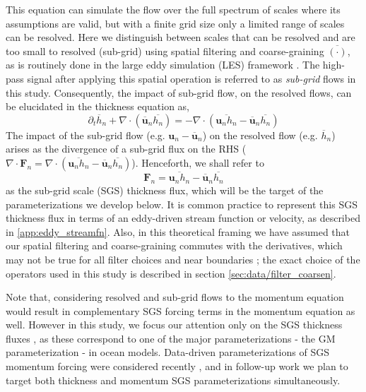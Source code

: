 \documentclass[draft]{agujournal2019}
\begin{document}
This equation can simulate the flow over the full spectrum of scales where its assumptions are valid, but with a finite grid size only a limited range of scales can be resolved. Here we distinguish between scales that can be resolved and are too small to resolved (sub-grid)
using spatial filtering and coarse-graining $\overline{(\cdot)}$, as is routinely done in the large eddy simulation (LES) framework \cite{sagaut2005large, aluie2018mapping}. The high-pass signal after applying this spatial operation is referred to as \textit{sub-grid} flows in this study.
Consequently, the impact of sub-grid flow, on the resolved flows, can be elucidated in the thickness equation as,
\begin{equation}
    \partial_t \overline{h}_n +  \nabla \cdot (\overline{\mathbf{u}}_n \overline{h_n}) = - \nabla \cdot (\overline{\mathbf{u}_n h_n} - \overline{\mathbf{u}}_n \overline{h_n}) %
\end{equation}
The impact of the sub-grid flow (e.g. ${\mathbf{u}}_n -\overline{\mathbf{u}}_n$) on the resolved flow (e.g. $\overline{h}_n$) arises as the divergence of a sub-grid flux on the RHS ($\nabla \cdot \mathbf{F}_n = \nabla \cdot (\overline{\mathbf{u}_n h_n} - \overline{\mathbf{u}}_n \overline{h_n})$). Henceforth, we shall refer to 
\begin{equation}
\mathbf{F}_n = \overline{\mathbf{u}_n h_n} - \overline{\mathbf{u}}_n \overline{h_n}     
\end{equation}
as the sub-grid scale (SGS) thickness flux, which will be the target of the parameterizations we develop below. It is common practice to represent this SGS thickness flux in terms of an eddy-driven stream function or velocity, as described in \ref{app:eddy_streamfn}.
Also, in this theoretical framing we have assumed that our spatial filtering and coarse-graining commutes with the derivatives, which  may not be true for all filter choices and near boundaries \cite{moser2021statistical}; the exact choice of the operators used in this study is described in section \ref{sec:data/filter_coarsen}. 


Note that, considering resolved and sub-grid flows to the momentum equation would result in complementary SGS forcing terms in the momentum equation as well. However in this study, we focus our attention only on the SGS thickness fluxes , as these correspond to one of the major parameterizations - the GM parameterization - in ocean models. 
Data-driven parameterizations of SGS momentum forcing were considered recently \cite{perezhogin2024stable, zhang2023implementation, zanna2020data}, and in follow-up work we plan to target both thickness and momentum SGS parameterizations simultaneously. 
\end{document}
